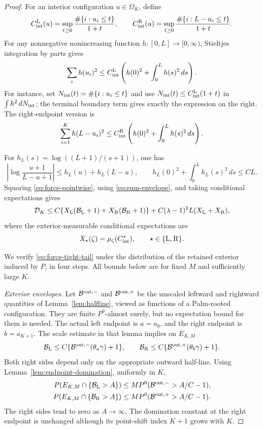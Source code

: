 \documentclass[11pt,reqno]{amsart}
\numberwithin{equation}{section}
\theoremstyle{definition}
\theoremstyle{remark}
\newcommand{\1}{\mathbf 1}
\newcommand{\dd}{\,d}
\newcommand{\calB}{\mathcal B}
\begin{document}
\begin{proof}
For an interior configuration $u\in\Omega_K$, define
\begin{equation}\label{eq:interior-count-definitions}
C_{\rm int}^{\rm L}(u)=\sup_{t\ge0}
 \frac{\#\{i:u_i\le t\}}{1+t},\qquad
C_{\rm int}^{\rm R}(u)=\sup_{t\ge0}
 \frac{\#\{i:L-u_i\le t\}}{1+t}.
\end{equation}
For any nonnegative nonincreasing function $h:[0,L]\to[0,\infty)$,
Stieltjes integration by parts gives
\begin{equation}\label{eq:sum-envelope}
\sum_i h(u_i)^2
\le C_{\rm int}^{\rm L}
\left(h(0)^2+\int_0^L h(s)^2\dd s\right).
\end{equation}
For instance, set $N_{\rm int}(t)=\#\{i:u_i\le t\}$ and use
$N_{\rm int}(t)\le C_{\rm int}^{\rm L}(1+t)$ in
$\int h^2\dd N_{\rm int}$; the terminal boundary term gives exactly
the expression on the right. The right-endpoint version is
\[
\sum_{i=1}^K h(L-u_i)^2
\le C_{\rm int}^{\rm R}
\left(h(0)^2+\int_0^Lh(s)^2\dd s\right).
\]

For $h_L(s)=\log((L+1)/(s+1))$, one has
\[
\left|\log\frac{u+1}{L-u+1}\right|
 \le h_L(u)+h_L(L-u),\qquad
h_L(0)^2+\int_0^Lh_L(s)^2\dd s\le CL.
\]
Squaring \eqref{eq:force-pointwise}, using
\eqref{eq:sum-envelope}, and taking conditional expectations gives
\begin{equation}\label{eq:force-total}
\mathcal D_K\le
C\{X_{\rm L}(\calB_{\rm L}+1)+X_{\rm R}(\calB_{\rm R}+1)\}
+C(\lambda-1)^2L(X_{\rm L}+X_{\rm R}),
\end{equation}
where the exterior-measurable conditional expectations are
\begin{equation}\label{eq:conditional-count-definitions}
X_\star(\zeta)=\mu_\zeta(C_{\rm int}^\star),
\qquad \star\in\{{\rm L},{\rm R}\}.
\end{equation}

We verify \eqref{eq:force-tight-tail} under the distribution of the retained
exterior induced by $P$, in four steps. All bounds below are for fixed $M$ and sufficiently large $K$.

\emph{Exterior envelopes.}
Let $\calB^{\rm out,-}$ and $\calB^{\rm out,+}$ be the unscaled
leftward and rightward quantities of Lemma~\ref{lem:halfline}, viewed
as functions of a Palm-rooted configuration. They are finite
$P^0$-almost surely, but no expectation bound for them is needed.
The actual left endpoint is $a=a_0$, and the right endpoint is
$b=a_{K+1}$. The scale estimate in that lemma implies on $E_{K,M}$
\[
\calB_{\rm L}\le C\{\calB^{\rm out,-}(\theta_a\gamma)+1\},\qquad
\calB_{\rm R}\le C\{\calB^{\rm out,+}(\theta_b\gamma)+1\}.
\]
Both right sides depend only on the appropriate outward half-line.
Using Lemma~\ref{lem:endpoint-domination}, uniformly in $K$,
\begin{align*}
P(E_{K,M}\cap\{\calB_{\rm L}>A\})
&\le M P^0(\calB^{\rm out,-}>A/C-1),\\
P(E_{K,M}\cap\{\calB_{\rm R}>A\})
&\le M P^0(\calB^{\rm out,+}>A/C-1).
\end{align*}
The right sides tend to zero as $A\to\infty$. The domination constant
at the right endpoint is unchanged although its point-shift index
$K+1$ grows with $K$.


\end{proof}
\end{document}

